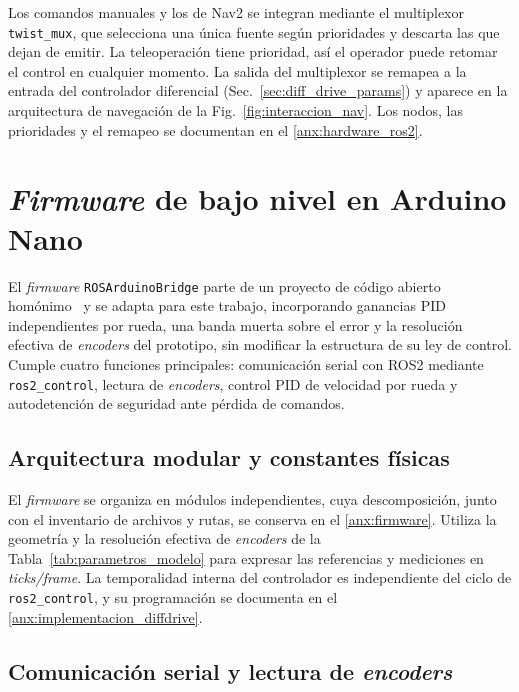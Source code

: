 Los comandos manuales y los de Nav2 se integran mediante el multiplexor
\texttt{twist\_mux}, que selecciona una única fuente según prioridades y
descarta las que dejan de emitir. La teleoperación tiene prioridad, así el
operador puede retomar el control en cualquier momento. La salida del
multiplexor se remapea a la entrada del controlador diferencial
(Sec.~\ref{sec:diff_drive_params}) y aparece en la arquitectura de navegación
de la Fig.~\ref{fig:interaccion_nav}. Los nodos, las prioridades y el remapeo
se documentan en el \ref{anx:hardware_ros2}.

\section{\texorpdfstring{\textit{Firmware}}{Firmware} de bajo nivel en Arduino Nano}
\label{ch:setup_arduino}

El \textit{firmware} \texttt{ROSArduinoBridge} parte de un proyecto de código abierto homónimo~\citep{newans_rosarduinobridge} y se adapta para este trabajo, incorporando ganancias PID independientes por rueda, una banda muerta sobre el error y la resolución efectiva de \textit{encoders} del prototipo, sin modificar la estructura de su ley de control. Cumple cuatro funciones principales: comunicación serial con \gls{ROS2} mediante \texttt{ros2\_control}, lectura de \textit{encoders}, control PID de velocidad por rueda y autodetención de seguridad ante pérdida de comandos.

\subsection{Arquitectura modular y constantes físicas}

El \textit{firmware} se organiza en módulos independientes, cuya descomposición, junto
con el inventario de archivos y rutas, se conserva en el \ref{anx:firmware}.
Utiliza la geometría y la resolución efectiva de \textit{encoders} de la
Tabla~\ref{tab:parametros_modelo} para expresar las referencias y mediciones en
\textit{ticks/frame}. La temporalidad interna del controlador es independiente
del ciclo de \texttt{ros2\_control}, y su programación se documenta en el
\ref{anx:implementacion_diffdrive}.

\subsection{Comunicación serial y lectura de \texorpdfstring{\textit{encoders}}{encoders}}
\label{sec:serial_firmware}

